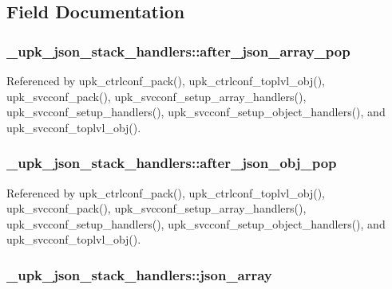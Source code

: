 \subsection{Field Documentation}
\subsubsection[{after\_\-json\_\-array\_\-pop}]{ {\bf \_\-upk\_\-json\_\-stack\_\-handlers::after\_\-json\_\-array\_\-pop}}\label{struct__upk__json__stack__handlers_af3cb94cb5c4e1386077206fddd0ccefa}


Referenced by upk\_\-ctrlconf\_\-pack(), upk\_\-ctrlconf\_\-toplvl\_\-obj(), upk\_\-svcconf\_\-pack(), upk\_\-svcconf\_\-setup\_\-array\_\-handlers(), upk\_\-svcconf\_\-setup\_\-handlers(), upk\_\-svcconf\_\-setup\_\-object\_\-handlers(), and upk\_\-svcconf\_\-toplvl\_\-obj().

\subsubsection[{after\_\-json\_\-obj\_\-pop}]{ {\bf \_\-upk\_\-json\_\-stack\_\-handlers::after\_\-json\_\-obj\_\-pop}}\label{struct__upk__json__stack__handlers_a834ab3a5104bde8b8fe3740a67b13523}


Referenced by upk\_\-ctrlconf\_\-pack(), upk\_\-ctrlconf\_\-toplvl\_\-obj(), upk\_\-svcconf\_\-pack(), upk\_\-svcconf\_\-setup\_\-array\_\-handlers(), upk\_\-svcconf\_\-setup\_\-handlers(), upk\_\-svcconf\_\-setup\_\-object\_\-handlers(), and upk\_\-svcconf\_\-toplvl\_\-obj().

\subsubsection[{json\_\-array}]{ {\bf \_\-upk\_\-json\_\-stack\_\-handlers::json\_\-array}}\label{struct__upk__json__stack__handlers_ae2cac7add3b653b8508b5c8d1ca6e0e5}


